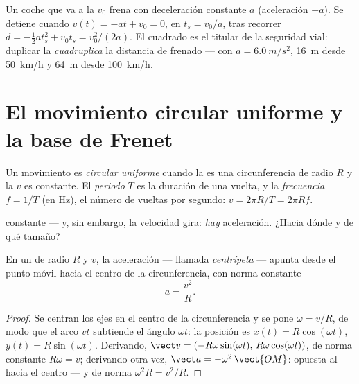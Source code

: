 \begin{example}\label{ex:g12:kinematics-2d:braking}
Un coche que va a la  $v_0$ frena con deceleración constante $a$
(aceleración $-a$). Se detiene cuando $v(t) = -a t + v_0 = 0$, en
$t_s = v_0/a$, tras recorrer
$d = -\tfrac12 a t_s^2 + v_0 t_s = v_0^2/(2a)$. El cuadrado es el
titular de la seguridad vial: duplicar la  \emph{cuadruplica} la
distancia de frenado --- con $a = \qty{6.0}{m/s^2}$, \qty{16}{m} desde
\qty{50}{km/h} y \qty{64}{m} desde \qty{100}{km/h}.
\end{example}

\section{El movimiento circular uniforme y la base de Frenet}

\begin{definition}\label{def:g12:kinematics-2d:ucm}
Un movimiento es \emph{circular uniforme} cuando la  es una circunferencia de radio $R$ y la
 $v$ es constante. El \emph{periodo}
$T$ es la duración de una vuelta, y la
\emph{frecuencia} $f = 1/T$ (en
\unit{Hz}), el número de vueltas por segundo:
$v = 2\pi R/T = 2\pi R f$.
\end{definition}

 constante --- y, sin embargo, la velocidad gira: \emph{hay}
aceleración. ¿Hacia dónde y de qué tamaño?

\begin{theorem}\label{thm:g12:kinematics-2d:centripetal}
%
En un  de radio $R$ y  $v$, la
aceleración --- llamada \emph{centrípeta} --- apunta desde el punto
móvil hacia el centro de la circunferencia, con norma constante
\[
a = \frac{v^2}{R}.
\]
\end{theorem}

\begin{proof}
Se centran los ejes en el centro de la circunferencia y se pone
$\omega = v/R$, de modo que el arco $v t$ subtiende el ángulo
$\omega t$: la posición es $x(t) = R\cos(\omega t)$,
$y(t) = R\sin(\omega t)$. Derivando,
$\vect v = (-R\omega\sin(\omega t),\, R\omega\cos(\omega t))$, de norma
constante $R\omega = v$; derivando otra vez,
$\vect a = -\omega^2\,\vect{OM}$: opuesta al  ---
hacia el centro --- y de norma $\omega^2 R = v^2/R$.
\end{proof}

